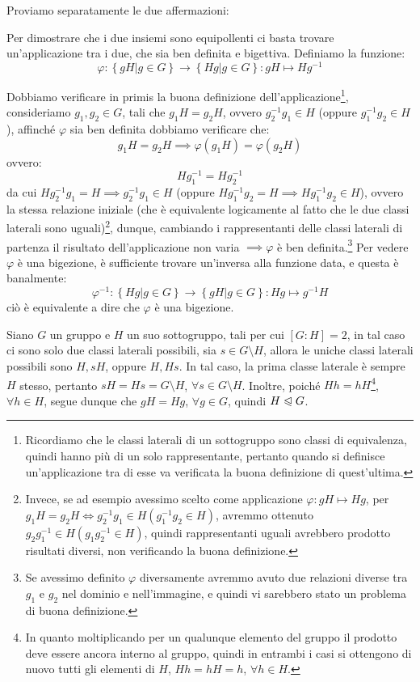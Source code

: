 \documentclass[11pt]{scrartcl}
\begin{document}
\begin{soln}
Proviamo separatamente le due affermazioni:
\begin{enumerate}[(1)]
	\ii Per dimostrare che i due insiemi sono equipollenti ci basta trovare un'applicazione tra i due, che sia ben definita e bigettiva. Definiamo la funzione:
		\[ \varphi : \left\{gH | g \in G\right\} \longrightarrow \left\{Hg | g \in G\right\} : gH \longmapsto Hg^{-1}
		\]
	\begin{enumerate}[(a)]
		\ii Dobbiamo verificare in primis la buona definizione dell'applicazione\footnote{Ricordiamo che le classi laterali di un sottogruppo sono classi di equivalenza, quindi hanno più di un solo rappresentante, pertanto quando si definisce un'applicazione tra di esse va verificata la buona definizione di quest'ultima.}, consideriamo $g_1,g_2 \in G$, tali che $g_1H=g_2H$, ovvero $g_2^{-1}g_1 \in H$ (oppure $g_1^{-1}g_2 \in H$), affinché $\varphi$ sia ben definita dobbiamo verificare che:
		\[ g_1H=g_2H
		\implies
		\varphi(g_1H)=\varphi(g_2H)
		\]
ovvero:
		\[ Hg_1^{-1}=Hg_2^{-1}
		\]
		da cui $Hg_2^{-1}g_1=H \implies g_2^{-1}g_1 \in H$ (oppure $Hg_1^{-1}g_2=H \implies Hg_1^{-1}g_2 \in H$), ovvero la stessa relazione iniziale (che è equivalente logicamente al fatto che le due classi laterali sono uguali)\footnote{Invece, se ad esempio avessimo scelto come applicazione $\varphi: gH \longmapsto Hg$, per $g_1H=g_2H \iff g_2^{-1}g_1 \in H (g_1^{-1}g_2 \in H)$, avremmo ottenuto $g_2g_1^{-1} \in H(g_1g_2^{-1} \in H)$, quindi rappresentanti uguali avrebbero prodotto risultati diversi, non verificando la buona definizione.}, dunque, cambiando i rappresentanti delle classi laterali di partenza il risultato dell'applicazione non varia $\implies \varphi$ è ben definita.\footnote{Se avessimo definito $\varphi$ diversamente avremmo avuto due relazioni diverse tra $g_1$ e $g_2$ nel dominio e nell'immagine, e quindi vi sarebbero stato un problema di buona definizione.}
		\ii Per vedere $\varphi$ è una bigezione, è sufficiente trovare un'inversa alla funzione data, e questa è banalmente:
			\[ \varphi^{-1} : \left\{Hg | g \in G\right\} \longrightarrow \left\{gH | g \in G\right\} : Hg \longmapsto g^{-1}H\]
			ciò è equivalente a dire che $\varphi$ è una bigezione.
		\end{enumerate}
	\ii Siano $G$ un gruppo e $H$ un suo sottogruppo, tali per cui $[G : H] = 2$, in tal caso ci sono solo due classi laterali possibili, sia $s \in G\setminus H$, allora le uniche classi laterali possibili sono $H, sH$, oppure $H, Hs$. In tal caso, la prima classe laterale è sempre $H$ stesso, pertanto $sH=Hs=G\setminus H$, $\forall s \in G\setminus H$. Inoltre, poiché $Hh=hH$\footnote{In quanto moltiplicando per un qualunque elemento del gruppo il prodotto deve essere ancora interno al gruppo, quindi in entrambi i casi si ottengono di nuovo tutti gli elementi di $H$, $Hh=hH=h$, $\forall h \in H$.}, $\forall h \in H$, segue dunque che $gH=Hg$, $\forall g \in G$, quindi $H \trianglelefteqslant G$.
	\end{enumerate}
\end{soln}
\end{document}
